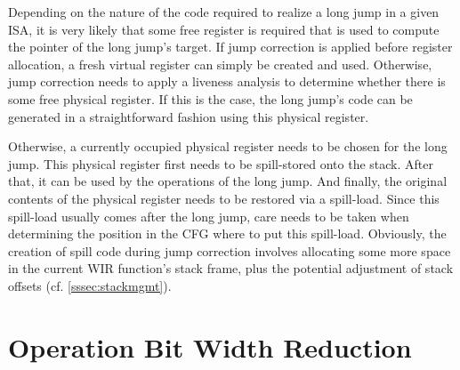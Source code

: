 Depending on the nature of the code required to realize a long jump in a given \gls{ISA}, it is very likely that some free register is required that is used to compute the pointer of the long jump's target.
If jump correction is applied before register allocation, a fresh virtual register can simply be created and used.
Otherwise, jump correction needs to apply a liveness analysis to determine whether there is some free physical register.
If this is the case, the long jump's code can be generated in a straightforward fashion using this physical register.

Otherwise, a currently occupied physical register needs to be chosen for the long jump.
This physical register first needs to be spill-stored onto the stack.
After that, it can be used by the operations of the long jump.
And finally, the original contents of the physical register needs to be restored via a spill-load.
Since this spill-load usually comes after the long jump, care needs to be taken when determining the position in the \gls{CFG} where to put this spill-load.
Obviously, the creation of spill code during jump correction involves allocating some more space in the current \gls{WIR} function's stack frame, plus the potential adjustment of stack offsets (cf. \cref{sssec:stackmgmt}).


\section{Operation Bit Width Reduction}
\label{sec:optopwidthretarget}

